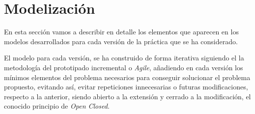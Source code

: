 \documentclass{article}
\begin{document}
\section{Modelización}
En esta sección vamos a describir en detalle los elementos que aparecen en los modelos desarrollados para cada versión de la práctica que se ha considerado.
\par
El modelo para cada versión, se ha construido de forma iterativa siguiendo el la metodología del prototipado incremental o \textit{Agile}, añadiendo en cada versión los mínimos elementos del problema necesarios para conseguir solucionar el problema propuesto, evitando así, evitar repeticiones innecesarias o futuras modificaciones, respecto a la anterior, siendo abierto a la extensión y cerrado a la modificación, el conocido principio de \textit{Open Closed}.
\end{document}
